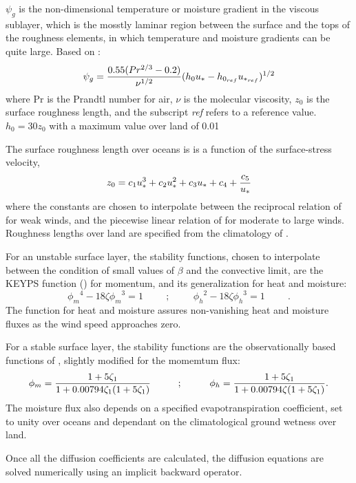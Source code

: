 $\psi_g$ is the non-dimensional temperature or moisture gradient in the viscous sublayer, 
which is the mosstly laminar region between the surface and the tops of the roughness 
elements, in which temperature and moisture gradients can be quite large.
Based on \cite{yagkad:74}:
\[
\psi_{g} = { 0.55 (Pr^{2/3} - 0.2) \over \nu^{1/2} }
(h_{0}u_{*} - h_{0_{ref}}u_{*_{ref}})^{1/2}
\]
where Pr is the Prandtl number for air, $\nu$ is the molecular viscosity, $z_{0}$ is the 
surface roughness length, and the subscript {\em ref} refers to a reference value.
$h_{0} = 30z_{0}$ with a maximum value over land of 0.01
 
The surface roughness length over oceans is is a function of the surface-stress velocity,
\[
{z_0} = c_1u^3_* + c_2u^2_* + c_3u_* + c_4 + {c_5 \over {u_*}}
\]
where the constants are chosen to interpolate between the reciprocal relation of
\cite{kondo:75} for weak winds, and the piecewise linear relation of \cite{larpond:81}
for moderate to large winds.  Roughness lengths over land are specified
from the climatology of \cite{dorsell:89}.

For an unstable surface layer, the stability functions, chosen to interpolate between the
condition of small values of $\beta$ and the convective limit, are the KEYPS function 
(\cite{pano:73}) for momentum, and its generalization for heat and moisture:  
\[
{\phi_m}^4 - 18 \zeta {\phi_m}^3 = 1 \hspace{1cm} ; \hspace{1cm} 
{\phi_h}^2 - 18 \zeta {\phi_h}^3 = 1 \hspace{1cm} .
\]
The function for heat and moisture assures non-vanishing heat and moisture fluxes as the wind 
speed approaches zero. 

For a stable surface layer, the stability functions are the observationally 
based functions of \cite{clarke:70},  slightly modified for
the momemtum flux:  
\[
{\phi_m} = { { 1 + 5 {{\zeta}_1} } \over { 1 + 0.00794 {{\zeta}_1}
(1+ 5 {{\zeta}_1}) } } \hspace{1cm} ; \hspace{1cm}
{\phi_h} = { { 1 + 5 {{\zeta}_1} } \over { 1 + 0.00794 {\zeta}
(1+ 5 {{\zeta}_1}) } } .
\]
The moisture flux also depends on a specified evapotranspiration
coefficient, set to unity over oceans and dependant on the climatological ground wetness over
land.  

Once all the diffusion coefficients are calculated, the diffusion equations are solved numerically
using an implicit backward operator.

